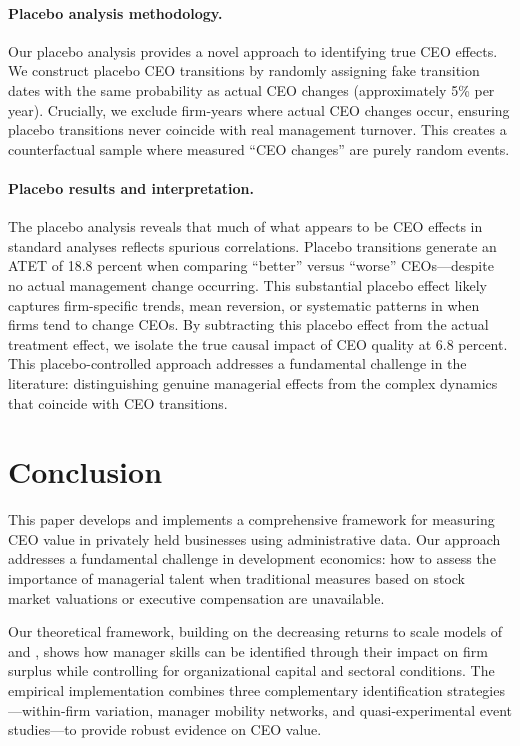 \documentclass[11pt,a4paper]{article}
\begin{document}
\paragraph{Placebo analysis methodology.} Our placebo analysis provides a novel approach to identifying true CEO effects. We construct placebo CEO transitions by randomly assigning fake transition dates with the same probability as actual CEO changes (approximately 5\% per year). Crucially, we exclude firm-years where actual CEO changes occur, ensuring placebo transitions never coincide with real management turnover. This creates a counterfactual sample where measured ``CEO changes'' are purely random events.

\paragraph{Placebo results and interpretation.} The placebo analysis reveals that much of what appears to be CEO effects in standard analyses reflects spurious correlations. Placebo transitions generate an ATET of 18.8 percent when comparing ``better'' versus ``worse'' CEOs---despite no actual management change occurring. This substantial placebo effect likely captures firm-specific trends, mean reversion, or systematic patterns in when firms tend to change CEOs. By subtracting this placebo effect from the actual treatment effect, we isolate the true causal impact of CEO quality at 6.8 percent. This placebo-controlled approach addresses a fundamental challenge in the literature: distinguishing genuine managerial effects from the complex dynamics that coincide with CEO transitions. 

\section{Conclusion}

This paper develops and implements a comprehensive framework for measuring CEO value in privately held businesses using administrative data. Our approach addresses a fundamental challenge in development economics: how to assess the importance of managerial talent when traditional measures based on stock market valuations or executive compensation are unavailable.

Our theoretical framework, building on the decreasing returns to scale models of \citet{AtkesonKehoe2005JPE} and \citet{McGrattan2012RED}, shows how manager skills can be identified through their impact on firm surplus while controlling for organizational capital and sectoral conditions. The empirical implementation combines three complementary identification strategies---within-firm variation, manager mobility networks, and quasi-experimental event studies---to provide robust evidence on CEO value.
\end{document}
